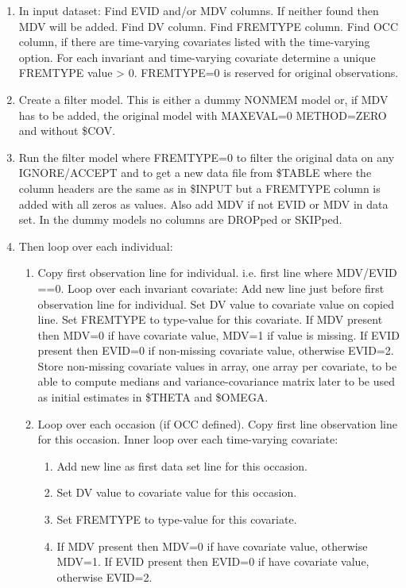 \begin{enumerate} 
	\item In input dataset: Find EVID and/or MDV columns. If neither found then MDV will be added. Find DV column. Find FREMTYPE column. Find OCC column, if there are time-varying covariates listed with the time-varying option. For each invariant and time-varying covariate  determine a unique FREMTYPE value > 0. FREMTYPE=0 is reserved for original observations.
    \item Create a filter model. This is either a dummy NONMEM model or, if MDV has to be added, the original model with MAXEVAL=0 METHOD=ZERO and without \$COV. 
	\item Run the filter model where FREMTYPE=0 to filter the original data on any IGNORE/ACCEPT and to get a new data file from \$TABLE where the column headers are the same as in \$INPUT but a FREMTYPE column is added with all zeros as values. Also add MDV if not EVID or MDV in data set. In the dummy models no columns are DROPped or SKIPped.
\item Then loop over each individual: 
\begin{enumerate}
	\item Copy first observation line for individual. i.e. first line where MDV/EVID ==0. 
Loop over each invariant covariate: Add new line just before first observation line for individual. 
Set DV value to covariate value on copied line. 
Set FREMTYPE to type-value for this covariate. 
If MDV present then MDV=0 if have covariate value, MDV=1 if value is missing. 
If EVID present then EVID=0 if non-missing covariate value, otherwise EVID=2. 
Store non-missing covariate values in array, one array per covariate, to be able to compute medians and 
variance-covariance matrix later to be used as initial estimates in \$THETA and \$OMEGA. 
	\item Loop over each occasion (if OCC defined). 
Copy first line observation line for this occasion. 
Inner loop over each time-varying covariate: 
\begin{enumerate}
	\item Add new line as first data set line for this occasion. 
    \item Set DV value to covariate value for this occasion. 
    \item Set FREMTYPE to type-value for this covariate. 
    \item If MDV present then MDV=0 if have covariate value, otherwise MDV=1. 
    If EVID present then EVID=0 if have covariate value, otherwise EVID=2. 

\end{enumerate}
\end{enumerate}
\end{enumerate}
